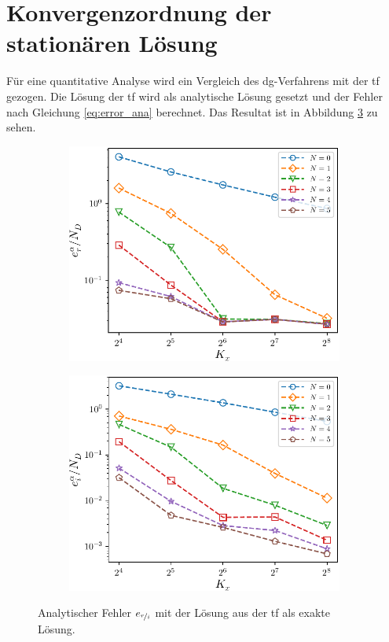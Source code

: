 \section{Konvergenzordnung der stationären Lösung}\label{sec:rates}
Für eine quantitative Analyse wird ein Vergleich des \ac{dg}-Verfahrens mit der \ac{tf} gezogen. Die Lösung der \ac{tf} wird als analytische Lösung gesetzt und der Fehler nach Gleichung \eqref{eq:error_ana} berechnet. Das Resultat ist in Abbildung \ref{fig:rates1} zu sehen.
\begin{figure}
    \centering
    \begin{subfigure}[b]{0.48\textwidth}
        \centering
        \includegraphics[width=\textwidth]{plots/test3/real_GL1.pdf}
        \label{fig:rates1_1}
    \end{subfigure}
    \hfill
    \begin{subfigure}[b]{0.48\textwidth}
        \centering
        \includegraphics[width=\textwidth]{plots/test3/imag_GL1.pdf}
        \label{fig:rates1_2}
    \end{subfigure}
    \caption[]
    {Analytischer Fehler $e_{\nicefrac{r}{i}}$ mit der Lösung aus der \ac{tf} als exakte Lösung.}
    \label{fig:rates1}
\end{figure}
